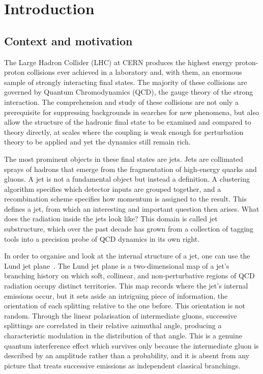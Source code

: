 \chapter{Introduction}
\label{cap:introducao}

\section{Context and motivation}
\label{sec:motivacao}

The Large Hadron Collider (LHC) at CERN produces the highest energy proton-proton
collisions ever achieved in a laboratory and, with them, an enormous sample of
strongly interacting final states. The majority of these collisions are governed
by Quantum Chromodynamics (QCD), the gauge theory of the strong interaction. The
comprehension and study of these collisions are not only a prerequisite for
suppressing backgrounds in searches for new phenomena, but also allow the
structure of the hadronic final state to be examined and compared to theory
directly, at scales where the coupling is weak enough for perturbation theory to
be applied and yet the dynamics still remain rich.

The most prominent objects in these final states are jets. Jets are collimated
sprays of hadrons that emerge from the fragmentation of high-energy quarks and
gluons. A jet is not a fundamental object but instead a definition. A clustering
algorithm specifies which detector inputs are grouped together, and a
recombination scheme specifies how momentum is assigned to the result. This
defines a jet, from which an interesting and important question then arises. What
does the radiation inside the jets look like? This domain is called jet
substructure, which over the past decade has grown from a collection of tagging
tools into a precision probe of QCD dynamics in its own right.

In order to organise and look at the internal structure of a jet, one can use the
Lund jet plane~\cite{Dreyer:2018nbf}. The Lund jet plane is a two-dimensional map of a
jet's branching history on which soft, collinear, and non-perturbative regions of
QCD radiation occupy distinct territories. This map records where the jet's
internal emissions occur, but it sets aside an intriguing piece of information,
the orientation of each splitting relative to the one before. This orientation is
not random. Through the linear polarisation of intermediate gluons, successive
splittings are correlated in their relative azimuthal angle, producing a
characteristic modulation in the distribution of that angle. This is a genuine
quantum interference effect which survives only because the intermediate gluon is
described by an amplitude rather than a probability, and it is absent from any
picture that treats successive emissions as independent classical branchings.

